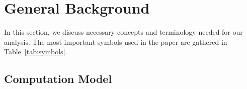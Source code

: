 \documentclass[sigplan,review,anonymous]{acmart}\settopmatter{printfolios=true,printccs=false,printacmref=false}
\newcommand\mac[1]{\textcolor{red}{[Mac: #1]}}
\begin{document}
%
%

%

%

\section{General Background}

In this section, we discuss necessary concepts and terminology needed for our 
analysis. The most important symbols used in the paper are gathered in 
Table~\ref{tab:symbols}.


\subsection{Computation Model}
\end{document}
